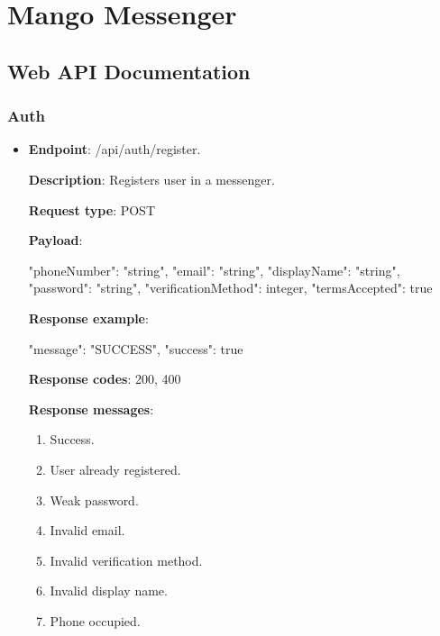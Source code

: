 \chapter{Mango Messenger}\label{ch:mango-messenger}


\section{Web API Documentation}\label{sec:web-api-documentation}

\subsection{Auth}\label{subsec:auth}
\begin{itemize}
    \item \textbf{Endpoint}: /api/auth/register.

    \textbf{Description}: Registers user in a messenger.

    \textbf{Request type}: POST

    \textbf{Payload}:

    \begin{spverbatim}
    {
        "phoneNumber": "string",
        "email": "string",
        "displayName": "string",
        "password": "string",
        "verificationMethod": integer,
        "termsAccepted": true
    }
    \end{spverbatim}

    \textbf{Response example}:

    \begin{spverbatim}
    {
        "message": "SUCCESS",
        "success": true
    }
    \end{spverbatim}

    \textbf{Response codes}: 200, 400

    \textbf{Response messages}:
    \begin{enumerate}
        \item Success.
        \item User already registered.
        \item Weak password.
        \item Invalid email.
        \item Invalid verification method.
        \item Invalid display name.
        \item Phone occupied.
    \end{enumerate}


\end{itemize}
